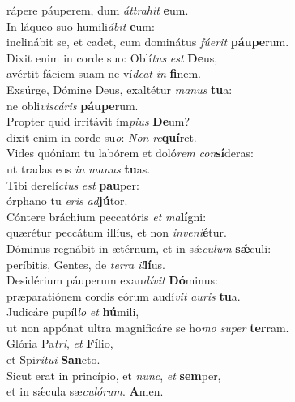 \evenverse rápere páuperem, dum \textit{át}\textit{tra}\textit{hit} \textbf{e}um.\\
\oddverse In láqueo suo humili\textit{á}\textit{bit} \textbf{e}um:~\*\\
\oddverse inclinábit se, et cadet, cum dominátus \textit{fú}\textit{e}\textit{rit} \textbf{páu}\textbf{pe}rum.\\
\evenverse Dixit enim in corde suo: Oblí\textit{tus} \textit{est} \textbf{De}us,~\*\\
\evenverse avértit fáciem suam ne ví\textit{de}\textit{at} \textit{in} \textbf{fi}nem.\\
\oddverse Exsúrge, Dómine Deus, exaltétur \textit{ma}\textit{nus} \textbf{tu}a:~\*\\
\oddverse ne obli\textit{vi}\textit{scá}\textit{ris} \textbf{páu}\textbf{pe}rum.\\
\evenverse Propter quid irritávit ím\textit{pi}\textit{us} \textbf{De}um?~\*\\
\evenverse dixit enim in corde su\textit{o}: \textit{Non} \textit{re}\textbf{quí}ret.\\
\oddverse Vides quóniam tu labórem et doló\textit{rem} \textit{con}\textbf{sí}deras:~\*\\
\oddverse ut tradas eos \textit{in} \textit{ma}\textit{nus} \textbf{tu}as.\\
\evenverse Tibi derelí\textit{ctus} \textit{est} \textbf{pau}per:~\*\\
\evenverse órphano tu \textit{e}\textit{ris} \textit{ad}\textbf{jú}tor.\\
\oddverse Cóntere bráchium peccatóris \textit{et} \textit{ma}\textbf{lí}gni:~\*\\
\oddverse quærétur peccátum illíus, et non \textit{in}\textit{ve}\textit{ni}\textbf{é}tur.\\
\evenverse Dóminus regnábit in ætérnum, et in sǽ\textit{cu}\textit{lum} \textbf{sǽ}culi:~\*\\
\evenverse períbitis, Gentes, de \textit{ter}\textit{ra} \textit{il}\textbf{lí}us.\\
\oddverse Desidérium páuperum exau\textit{dí}\textit{vit} \textbf{Dó}minus:~\*\\
\oddverse præparatiónem cordis eórum audí\textit{vit} \textit{au}\textit{ris} \textbf{tu}a.\\
\evenverse Judicáre pupíl\textit{lo} \textit{et} \textbf{hú}mili,~\*\\
\evenverse ut non appónat ultra magnificáre se ho\textit{mo} \textit{su}\textit{per} \textbf{ter}ram.\\
\oddverse Glória Pa\textit{tri}, \textit{et} \textbf{Fí}lio,~\*\\
\oddverse et Spi\textit{rí}\textit{tu}\textit{i} \textbf{San}cto.\\
\evenverse Sicut erat in princípio, et \textit{nunc}, \textit{et} \textbf{sem}per,~\*\\
\evenverse et in sǽcula sæ\textit{cu}\textit{ló}\textit{rum}. \textbf{A}men.\\
